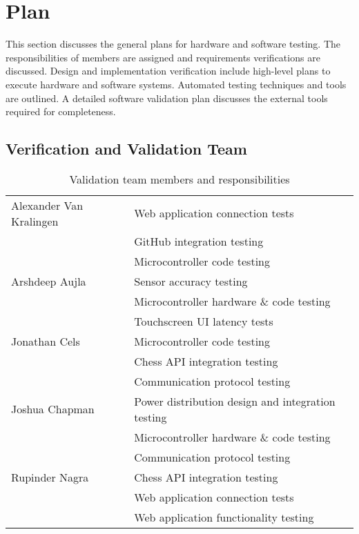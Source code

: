 \documentclass[12pt, titlepage]{article}
\begin{document}
\section{Plan}
This section discusses the general plans for hardware and software testing. The 
responsibilities of members are assigned and requirements verifications are discussed. 
Design and implementation verification include high-level plans to execute hardware 
and software systems. Automated testing techniques and tools are outlined. 
A detailed software validation plan discusses the external tools required for 
completeness. 

\subsection{Verification and Validation Team}
\begin{table}[hp]
  \caption{Validation team members and responsibilities}
  \begin{tabular}{ |p{4.5cm}||p{9cm}|  }
    \hline
    Alexander Van Kralingen & Web application connection tests\\
    & GitHub integration testing\\
    & Microcontroller code testing\\
    \hline
    Arshdeep Aujla & Sensor accuracy testing\\
    & Microcontroller hardware \& code testing\\
    & Touchscreen UI latency tests\\
    \hline
    Jonathan Cels & Microcontroller code testing\\
    & Chess API integration testing\\
    & Communication protocol testing\\
    \hline
    Joshua Chapman& Power distribution design and integration testing\\
    & Microcontroller hardware \& code testing\\
    & Communication protocol testing\\
    \hline
    Rupinder Nagra & Chess API integration testing\\ 
    & Web application connection tests\\
    & Web application functionality testing\\
    \hline
  \end{tabular}
\end{table}
\end{document}
